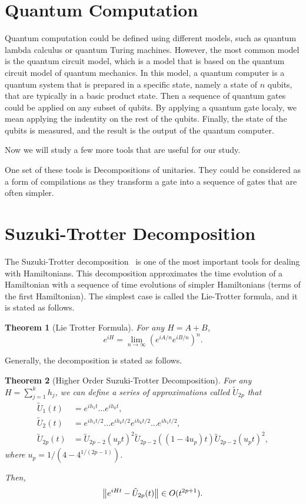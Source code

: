 \documentclass{report}
\newtheorem{theorem}{Theorem}
\begin{document}
\section{Quantum Computation}

Quantum computation could be defined using different models, such as quantum lambda calculus or quantum Turing machines. However, the most common model is the quantum circuit model, which is a model that is based on the quantum circuit model of quantum mechanics. In this model, a quantum computer is a quantum system that is prepared in a specific state, namely a state of $n$ qubits, that are typically in a basic product state. Then a sequence of quantum gates could be applied on any subset of qubits. By applying a quantum gate localy, we mean applying the indentity on the rest of the qubits. Finally, the state of the qubits is measured, and the result is the output of the quantum computer.

Now we will study a few more tools that are useful for our study.

One set of these tools is Decompositions of unitaries. They could be considered as a form of compilations as they transform a gate into a sequence of gates that are often simpler.

\section{Suzuki-Trotter Decomposition}

The Suzuki-Trotter decomposition~\cite{trotter1959, suzuki1991} is one of the most important tools for dealing with Hamiltonians. This decomposition approximates the time evolution of a Hamiltonian with a sequence of time evolutions of simpler Hamiltonians (terms of the first Hamiltonian). The simplest case is called the Lie-Trotter formula, and it is stated as follows.

\begin{theorem}[Lie Trotter Formula]
For any $H = A + B$,
\begin{equation}
  e^{iH} = \lim_{n \to \infty} (e^{iA/n} e^{iB/n})^n.
\end{equation}
\end{theorem}

Generally, the decomposition is stated as follows.
\begin{theorem}[Higher Order Suzuki-Trotter Decomposition]
  For any $H = \sum_{j=1}^k h_j$, we can define a series of approximations called $\tilde{U}_{2p}$ that
  \begin{align}
\tilde{U}_1(t) &= e^{i h_1 t}\dots e^{i h_k t}, \\
\tilde{U}_2(t) &= e^{i h_1 t / 2}\dots e^{i h_k t / 2} e^{i h_k t / 2}\dots e^{i h_1 t / 2}, \\
\tilde{U}_{2p}(t) &= \tilde{U}_{2p - 2}(u_p t)^2 \tilde{U}_{2p- 2}((1 - 4u_p) t) \tilde{U}_{2p - 2}(u_p t)^2,
  \end{align}
  where $u_p = 1/(4 - 4^{1/(2p - 1)})$.

  Then, 
  \begin{equation}
    \norm{e^{iHt} - \tilde{U}_{2p}(t)} \in O(t^{2p + 1}).
  \end{equation}
\end{theorem}
\end{document}

